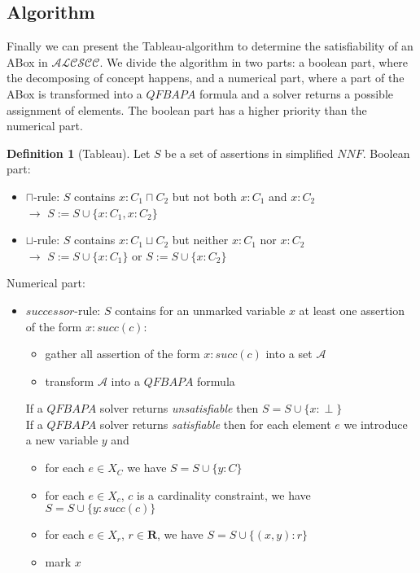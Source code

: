 \documentclass[a4paper,11pt]{scrartcl}
\theoremstyle{break}
\theoremstyle{definition}
\newtheorem{mydef}{Definition}
\begin{document}
\subsection{Algorithm}
Finally we can present the Tableau-algorithm to determine the satisfiability of an ABox in $\mathcal{ALCSCC}$. We divide the algorithm in two parts: a boolean part, where the decomposing of concept happens,  and a numerical part, where a part of the ABox is transformed into a $QFBAPA$ formula and a solver returns a possible assignment of elements. The boolean part has a higher priority than the numerical part.
\begin{mydef}[Tableau]
Let $S$ be a set of assertions in simplified $NNF$.
Boolean part:
\begin{itemize}
\item\label{cap} $\sqcap$-rule: $S$ contains $x:C_1\sqcap C_2$ but not both $x:C_1$ and $x:C_2$\\
$\rightarrow$ $S:=S\cup\{x:C_1, x:C_2\}$
\item\label{cup} $\sqcup$-rule: $S$ contains $x:C_1\sqcup C_2$ but neither $x:C_1$ nor $x:C_2$\\
$\rightarrow$ $S:=S\cup\{x:C_1\}$ or $S:=S\cup\{x:C_2\}$
\end{itemize}
Numerical part:
\begin{itemize}
\item\label{succ} $successor$-rule: $S$ contains for an unmarked variable $x$ at least one assertion of the form $x:succ(c)$:
\begin{itemize}
\item gather all assertion of the form $x:succ(c)$ into a set $\mathcal{A}$
\item transform $\mathcal{A}$ into a $QFBAPA$ formula
\end{itemize}
If a $QFBAPA$ solver returns \textit{unsatisfiable} then $S=S\cup\{x:\perp\}$\\
If a $QFBAPA$ solver returns \textit{satisfiable} then
for each element $e$ we introduce a new variable $y$ and
\begin{itemize}
\item for each $e\in X_C$ we have $S=S\cup\{y:C\}$
\item for each $e\in X_{c}$, $c$ is a cardinality constraint, we have $S=S\cup\{y:succ(c)\}$
\item for each $e\in X_r$, $r\in\mathbf{R}$, we have $S=S\cup\{(x,y):r\}$
\item mark $x$
\end{itemize}
\end{itemize}
\end{mydef}
\end{document}
